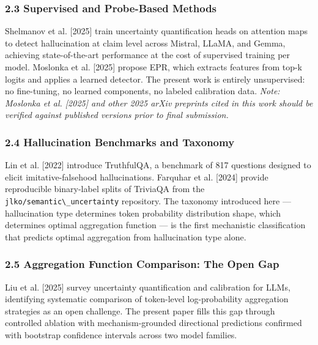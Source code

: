 \subsubsection{2.3 Supervised and Probe-Based Methods}

Shelmanov et al. [2025] train uncertainty quantification heads on attention maps to detect hallucination at claim level across Mistral, LLaMA, and Gemma, achieving state-of-the-art performance at the cost of supervised training per model. Moslonka et al. [2025] propose EPR, which extracts features from top-k logits and applies a learned detector. The present work is entirely unsupervised: no fine-tuning, no learned components, no labeled calibration data. \textit{Note: Moslonka et al. [2025] and other 2025 arXiv preprints cited in this work should be verified against published versions prior to final submission.}

\subsubsection{2.4 Hallucination Benchmarks and Taxonomy}

Lin et al. [2022] introduce TruthfulQA, a benchmark of 817 questions designed to elicit imitative-falsehood hallucinations. Farquhar et al. [2024] provide reproducible binary-label splits of TriviaQA from the \texttt{jlko/semantic\textbackslash \_uncertainty} repository. The taxonomy introduced here --- hallucination type determines token probability distribution shape, which determines optimal aggregation function --- is the first mechanistic classification that predicts optimal aggregation from hallucination type alone.

\subsubsection{2.5 Aggregation Function Comparison: The Open Gap}

Liu et al. [2025] survey uncertainty quantification and calibration for LLMs, identifying systematic comparison of token-level log-probability aggregation strategies as an open challenge. The present paper fills this gap through controlled ablation with mechanism-grounded directional predictions confirmed with bootstrap confidence intervals across two model families.

